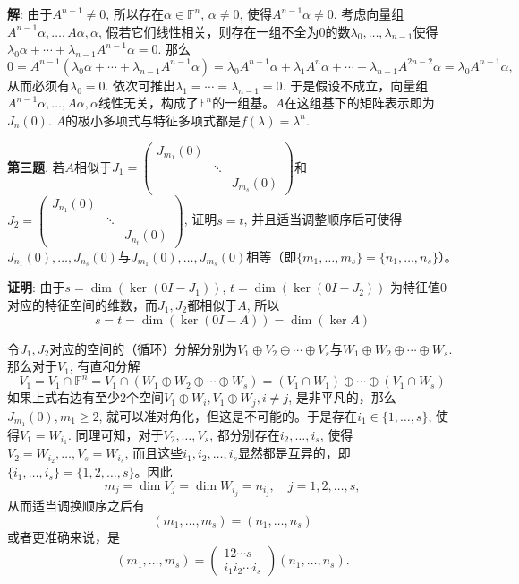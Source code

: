 {\bf 解}: 由于$A^{n-1} \neq 0$, 所以存在$\alpha \in \mathbb{F}^n$, $\alpha \neq 0$, 使得$A^{n-1} \alpha \neq 0$. 考虑向量组$A^{n-1} \alpha, \ldots, A\alpha, \alpha$, 假若它们线性相关，则存在一组不全为$0$的数$\lambda_0, \ldots, \lambda_{n-1}$使得$\lambda_0 \alpha + \cdots + \lambda_{n-1} A^{n-1} \alpha = 0$. 那么
$$0 = A^{n-1}(\lambda_0 \alpha + \cdots + \lambda_{n-1} A^{n-1} \alpha) = \lambda_0 A^{n-1} \alpha + \lambda_1 A^{n} \alpha + \cdots + \lambda_{n-1} A^{2n-2} \alpha = \lambda_0 A^{n-1} \alpha,$$
从而必须有$\lambda_0 = 0$. 依次可推出$\lambda_1 = \cdots = \lambda_{n-1} = 0$. 于是假设不成立，向量组$A^{n-1} \alpha, \ldots, A\alpha, \alpha$线性无关，构成了$\mathbb{F}^n$的一组基。$A$在这组基下的矩阵表示即为$J_n(0)$. $A$的极小多项式与特征多项式都是$f(\lambda) = \lambda^n$.

\newpageorvspace

{\bf 第三题}. 若$A$相似于$J_1 = \begin{pmatrix} J_{m_1}(0) & & \\ & \ddots & \\ & & J_{m_s}(0) \end{pmatrix}$和$J_2 = \begin{pmatrix} J_{n_1}(0) & & \\ & \ddots & \\ & & J_{n_t}(0) \end{pmatrix}$, 证明$s=t$, 并且适当调整顺序后可使得$J_{n_1}(0), \ldots, J_{n_s}(0)$与$J_{m_1}(0), \ldots, J_{m_s}(0)$相等（即$\{ m_1, \ldots, m_s \} = \{ n_1, \ldots, n_s \}$）。

{\bf 证明}: 由于$s = \dim (\ker (0 I - J_1))$, $t = \dim (\ker (0 I - J_2))$ 为特征值$0$对应的特征空间的维数，而$J_1, J_2$都相似于$A$, 所以
$$s = t = \dim(\ker (0 I - A)) = \dim(\ker A)$$

令$J_1, J_2$对应的空间的（循环）分解分别为$V_1\oplus V_2 \oplus \cdots \oplus V_s$与$W_1\oplus W_2 \oplus \cdots \oplus W_s$. 那么对于$V_1$, 有直和分解
$$V_1 = V_1 \cap \mathbb{F}^n = V_1 \cap (W_1\oplus W_2 \oplus \cdots \oplus W_s) = (V_1 \cap W_1) \oplus \cdots \oplus (V_1 \cap W_s)$$
如果上式右边有至少2个空间$V_1 \oplus W_i, V_1 \oplus W_j, i\neq j$, 是非平凡的，那么$J_{m_1}(0), m_1\geqslant 2$, 就可以准对角化，但这是不可能的。于是存在$i_1 \in \{1, \ldots, s\}$, 使得$V_1 = W_{i_1}$. 同理可知，对于$V_2, \ldots, V_s$, 都分别存在$i_2, \ldots, i_s$, 使得$V_2 = W_{i_2}, \ldots, V_s = W_{i_s}$, 而且这些$i_1, i_2, \ldots, i_s$显然都是互异的，即$\{i_1, \ldots, i_s\} = \{1, 2, \ldots, s\}$。因此
$$m_j = \dim V_j = \dim W_{i_j} = n_{i_j}, \quad j = 1, 2, \ldots, s,$$
从而适当调换顺序之后有
$$(m_1, \ldots, m_s) = (n_1, \ldots, n_s)$$
或者更准确来说，是
$$(m_1, \ldots, m_s) = \begin{pmatrix} 1 2 \cdots s \\ i_1 i_2 \cdots i_s \end{pmatrix} (n_1, \ldots, n_s).$$


